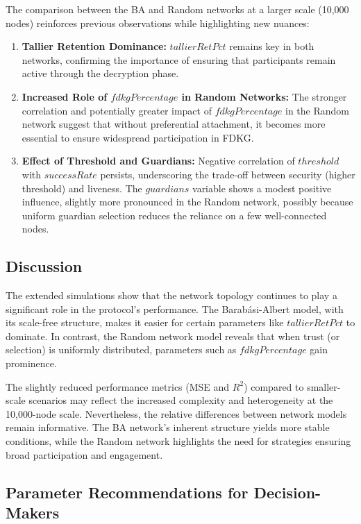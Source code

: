 \documentclass[runningheads]{llncs}
\begin{document}
The comparison between the BA and Random networks at a larger scale (10,000 nodes) reinforces previous observations while highlighting new nuances:

\begin{enumerate}
    \item \textbf{Tallier Retention Dominance:} $tallierRetPct$ remains key in both networks, confirming the importance of ensuring that participants remain active through the decryption phase.
    \item \textbf{Increased Role of $fdkgPercentage$ in Random Networks:} The stronger correlation and potentially greater impact of $fdkgPercentage$ in the Random network suggest that without preferential attachment, it becomes more essential to ensure widespread participation in FDKG.
    \item \textbf{Effect of Threshold and Guardians:} Negative correlation of $threshold$ with $successRate$ persists, underscoring the trade-off between security (higher threshold) and liveness. The $guardians$ variable shows a modest positive influence, slightly more pronounced in the Random network, possibly because uniform guardian selection reduces the reliance on a few well-connected nodes.
\end{enumerate}

\subsection{Discussion}

The extended simulations show that the network topology continues to play a significant role in the protocol’s performance. The Barabási-Albert model, with its scale-free structure, makes it easier for certain parameters like $tallierRetPct$ to dominate. In contrast, the Random network model reveals that when trust (or selection) is uniformly distributed, parameters such as $fdkgPercentage$ gain prominence.

The slightly reduced performance metrics (MSE and $R^2$) compared to smaller-scale scenarios may reflect the increased complexity and heterogeneity at the 10,000-node scale. Nevertheless, the relative differences between network models remain informative. The BA network's inherent structure yields more stable conditions, while the Random network highlights the need for strategies ensuring broad participation and engagement.

\subsection{Parameter Recommendations for Decision-Makers}
\end{document}
